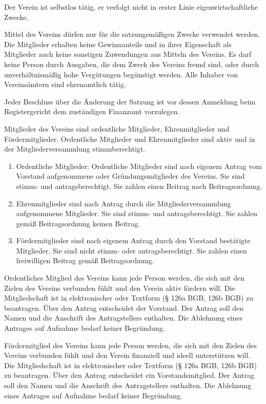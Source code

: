 \documentclass[parskip]{scrartcl}
\begin{document}
\begin{contract}
Der Verein ist selbstlos tätig, er verfolgt nicht in erster Linie eigenwirtschaftliche Zwecke.

Mittel des Vereins dürfen nur für die satzungsmäßigen Zwecke verwendet werden. Die Mitglieder erhalten keine Gewinnanteile und in ihrer Eigenschaft als Mitglieder auch keine sonstigen Zuwendungen aus Mitteln des Vereins. Es darf keine Person durch Ausgaben, die dem Zweck des Vereins fremd sind, oder durch unverhältnismäßig hohe Vergütungen begünstigt werden. Alle Inhaber von Vereinsämtern sind ehrenamtlich tätig.

Jeder Beschluss über die Änderung der Satzung ist vor dessen Anmeldung beim Registergericht dem zuständigen Finanzamt vorzulegen.


Mitglieder des Vereins sind ordentliche Mitglieder, Ehrenmitglieder und Fördermitglieder. Ordentliche Mitglieder und Ehrenmitglieder sind aktiv und in der Mitgliederversammlung stimmberechtigt.

\begin{enumerate}
\item Ordentliche Mitglieder: Ordentliche Mitglieder sind nach eigenem Antrag vom Vorstand aufgenommene oder Gründungsmitglieder des Vereins. Sie sind stimm- und antragsberechtigt. Sie zahlen einen Beitrag nach Beitragsordnung.
\item Ehrenmitglieder sind nach Antrag durch die Mitgliederversammlung aufgenommene Mitglieder. Sie sind stimm- und antragsberechtigt. Sie zahlen gemäß Beitragsordnung keinen Beitrag.
\item Fördermitglieder sind nach eigenem Antrag durch den Vorstand bestätigte Mitglieder. Sie sind nicht stimm- oder antragsberechtigt. Sie zahlen einen freiwilligen Beitrag gemäß Beitragsordnung.
\end{enumerate}

Ordentliches Mitglied des Vereins kann jede Person werden, die sich mit den Zielen des Vereins verbunden fühlt und den Verein aktiv fördern will. Die Mitgliedschaft ist in elektronischer oder Textform (§ 126a BGB, 126b BGB) zu beantragen. Über den Antrag entscheidet der Vorstand. Der Antrag soll den Namen und die Anschrift des Antragstellers enthalten. Die Ablehnung eines Antrages auf Aufnahme bedarf keiner Begründung.

Fördermitglied des Vereins kann jede Person werden, die sich mit den Zielen des Vereins verbunden fühlt und den Verein finanziell und ideell unterstützen will. Die Mitgliedschaft ist in elektronischer oder Textform (§ 126a BGB, 126b BGB) zu beantragen. Über den Antrag entscheidet ein Vorstandsmitglied. Der Antrag soll den Namen und die Anschrift des Antragstellers enthalten. Die Ablehnung eines Antrages auf Aufnahme bedarf keiner Begründung.


\end{contract}
\end{document}
